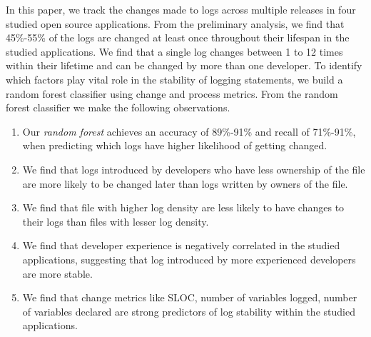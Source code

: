 In this paper, we track the changes made to logs across multiple releases in four studied open source applications. From the preliminary analysis, we find that 45\%-55\% of the logs are changed at least once throughout their lifespan in the studied applications. We find that a single log changes between 1 to 12 times within their lifetime and can be changed by more than one developer. To identify which factors play vital role in the stability of logging statements, we build a random forest classifier using change and process metrics. From the random forest classifier we make the following observations.
\begin{enumerate}
	\item  Our \textsl{random forest} achieves an accuracy of 89\%-91\% and recall of 71\%-91\%, when predicting which logs have higher likelihood of getting changed.
	\item We find that logs introduced by developers who have less ownership of the file are more likely to be changed later than logs written by owners of the file. 
	\item We find that file with higher log density are less likely to have changes to their logs than files with lesser log density.
	\item We find that developer experience is negatively correlated in the studied applications, suggesting that log introduced by more experienced developers are more stable. 
	\item We find that change metrics like SLOC, number of variables logged, number of variables declared are strong predictors of log stability within the studied applications. 

\end{enumerate}





%


